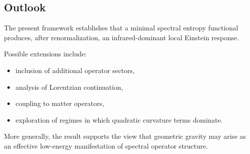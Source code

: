 \subsection{Outlook}
  \label{subsec:outlook}

  The present framework establishes that a minimal spectral entropy
  functional produces, after renormalization,
  an infrared-dominant local Einstein response.

  Possible extensions include:

  \begin{itemize}
    \item inclusion of additional operator sectors,
    \item analysis of Lorentzian continuation,
    \item coupling to matter operators,
    \item exploration of regimes in which quadratic curvature terms dominate.
  \end{itemize}

  More generally, the result supports the view that geometric gravity
  may arise as an effective low-energy manifestation of spectral
  operator structure.
